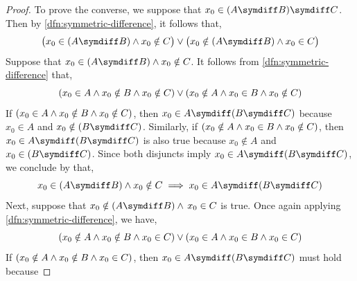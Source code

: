 \begin{proof}
    \vspace{0.1cm}
    \noindent To prove the converse, we suppose that \( x_{0} \in \mleft( A \symdiff B \mright) \symdiff C \).
    Then by \cref{dfn:symmetric-difference}, it follows that,
    \begin{equation}
        \label{eq:rhs-predicate-form}
        \big( x_{0} \in \mleft( A \symdiff B \mright) \land x_{0} \notin C \big)
        \lor
        \big( x_{0} \notin \mleft( A \symdiff B \mright) \land x_{0} \in C \big)
    \end{equation}
    Suppose that \( x_{0} \in \mleft( A \symdiff B \mright) \land x_{0} \notin C \). It follows from
    \cref{dfn:symmetric-difference} that,
    \begin{equation*}
        \mleft( x_{0} \in A \land x_{0} \notin B \land x_{0} \notin C \mright)
        \lor
        \mleft( x_{0} \notin A \land x_{0} \in B \land x_{0} \notin C \mright)
    \end{equation*}
    If \( \mleft( x_{0} \in A \land x_{0} \notin B \land x_{0} \notin C \mright) \),
    then \( x_{0} \in A \symdiff \mleft( B \symdiff C \mright) \) because \( x_{0} \in A \) and
    \( x_{0} \notin \mleft( B \symdiff C \mright) \).
    Similarly, if \( \mleft( x_{0} \notin A \land x_{0} \in B \land x_{0} \notin C \mright) \),
    then \( x_{0} \in A \symdiff \mleft( B \symdiff C \mright) \) is also true because
    \( x_{0} \notin A \) and \( x_{0} \in \mleft( B \symdiff C \mright) \). Since both disjuncts imply
    \( x_{0} \in A \symdiff \mleft( B \symdiff C \mright) \), we conclude by  that,
    \begin{equation}
        \label{eq:left-disjunct-backward-implication}
        x_{0} \in \mleft( A \symdiff B \mright) \land  x_{0} \notin C
        \implies
        x_{0} \in A \symdiff \mleft( B \symdiff C \mright)
    \end{equation}
    Next, suppose that \( x_{0} \notin \mleft( A \symdiff B \mright) \land \, x_{0} \in C \) is true. Once again
    applying \cref{dfn:symmetric-difference}, we have,
    \begin{equation*}
        \mleft( x_{0} \notin A \land x_{0} \notin B \land x_{0} \in C \mright)
        \lor
        \mleft( x_{0} \in A \land x_{0} \in B \land x_{0} \in C \mright)
    \end{equation*}
    If \( \mleft( x_{0} \notin A \land x_{0} \notin B \land x_{0} \in C \mright) \),
    then \( x_{0} \in A \symdiff \mleft( B \symdiff C \mright) \) must hold because

\end{proof}
